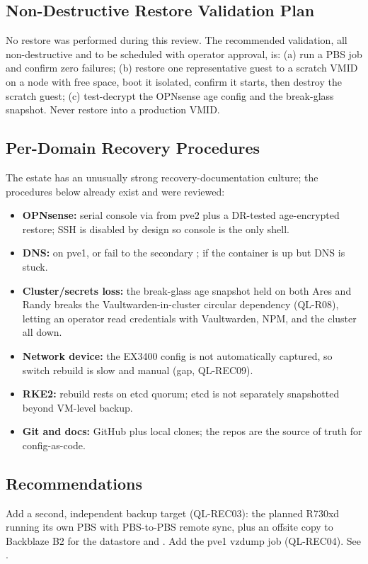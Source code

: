 \subsection{Non-Destructive Restore Validation Plan}

No restore was performed during this review. The recommended validation, all
non-destructive and to be scheduled with operator approval, is: (a) run a PBS
 job and confirm zero failures; (b) restore one representative guest to a
scratch VMID on a node with free space, boot it isolated, confirm it starts, then destroy
the scratch guest; (c) test-decrypt the OPNsense age config and the break-glass snapshot.
Never restore into a production VMID.

\subsection{Per-Domain Recovery Procedures}

The estate has an unusually strong recovery-documentation culture; the procedures below
already exist and were reviewed:

\begin{itemize}
\item \textbf{OPNsense:} serial console via  from pve2 plus a
DR-tested age-encrypted  restore; SSH is disabled by design so console
is the only shell.
\item \textbf{DNS:}  on pve1, or fail to the secondary ;
 if the container is up but DNS is stuck.
\item \textbf{Cluster/secrets loss:} the break-glass age snapshot held on both Ares and
Randy breaks the Vaultwarden-in-cluster circular dependency (QL-R08), letting an operator
read credentials with Vaultwarden, NPM, and the cluster all down.
\item \textbf{Network device:} the EX3400 config is not automatically captured, so switch
rebuild is slow and manual (gap, QL-REC09).
\item \textbf{RKE2:} rebuild rests on etcd quorum; etcd is not separately snapshotted
beyond VM-level backup.
\item \textbf{Git and docs:} GitHub plus local clones; the repos are the source of truth
for config-as-code.
\end{itemize}

\subsection{Recommendations}

Add a second, independent backup target (QL-REC03): the planned R730xd running its own
PBS with PBS-to-PBS remote sync, plus an offsite copy to Backblaze B2 for the datastore
and . Add the pve1 vzdump job (QL-REC04). See
.
